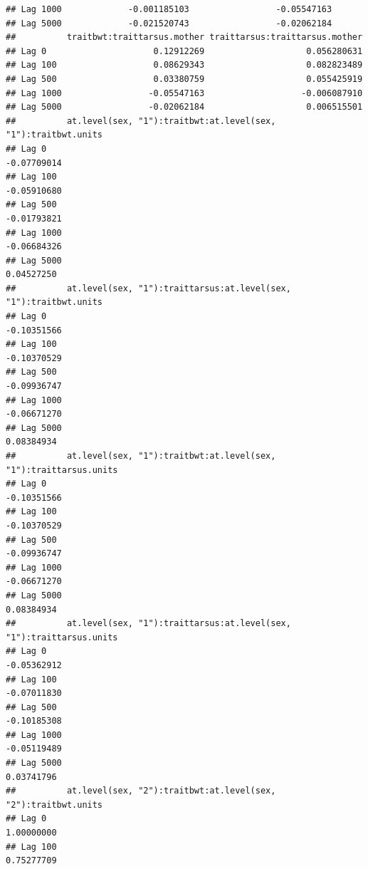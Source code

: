 \documentclass[
  12pt,
]{book}
\begin{document}
\begin{verbatim}
## Lag 1000             -0.001185103                 -0.05547163
## Lag 5000             -0.021520743                 -0.02062184
##          traitbwt:traittarsus.mother traittarsus:traittarsus.mother
## Lag 0                     0.12912269                    0.056280631
## Lag 100                   0.08629343                    0.082823489
## Lag 500                   0.03380759                    0.055425919
## Lag 1000                 -0.05547163                   -0.006087910
## Lag 5000                 -0.02062184                    0.006515501
##          at.level(sex, "1"):traitbwt:at.level(sex, "1"):traitbwt.units
## Lag 0                                                      -0.07709014
## Lag 100                                                    -0.05910680
## Lag 500                                                    -0.01793821
## Lag 1000                                                   -0.06684326
## Lag 5000                                                    0.04527250
##          at.level(sex, "1"):traittarsus:at.level(sex, "1"):traitbwt.units
## Lag 0                                                         -0.10351566
## Lag 100                                                       -0.10370529
## Lag 500                                                       -0.09936747
## Lag 1000                                                      -0.06671270
## Lag 5000                                                       0.08384934
##          at.level(sex, "1"):traitbwt:at.level(sex, "1"):traittarsus.units
## Lag 0                                                         -0.10351566
## Lag 100                                                       -0.10370529
## Lag 500                                                       -0.09936747
## Lag 1000                                                      -0.06671270
## Lag 5000                                                       0.08384934
##          at.level(sex, "1"):traittarsus:at.level(sex, "1"):traittarsus.units
## Lag 0                                                            -0.05362912
## Lag 100                                                          -0.07011830
## Lag 500                                                          -0.10185308
## Lag 1000                                                         -0.05119489
## Lag 5000                                                          0.03741796
##          at.level(sex, "2"):traitbwt:at.level(sex, "2"):traitbwt.units
## Lag 0                                                       1.00000000
## Lag 100                                                     0.75277709

\end{verbatim}
\end{document}
